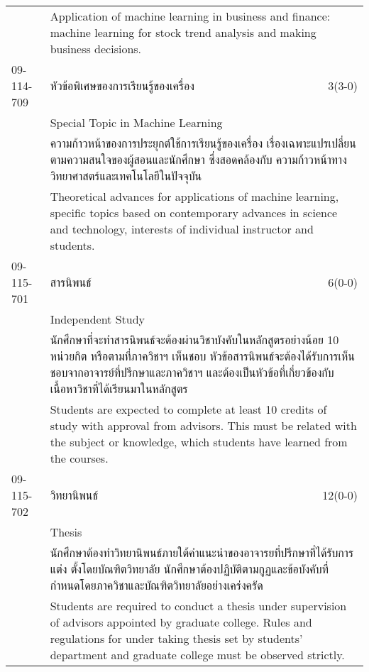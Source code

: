 \begin{longtable}{p{}p{}r{}}
&  \multicolumn{2}{p{0.75\textwidth}}{Application of machine learning in business and finance: machine learning for stock trend analysis and making business decisions.} \vspace{8mm} \\*
09-114-709 & หัวข้อพิเศษของการเรียนรู้ของเครื่อง  & 3(3-0)\\*
 & Special Topic in Machine Learning & \phantom{x} \vspace{3mm} \\*
&  \multicolumn{2}{p{0.75\textwidth}}{ความก้าวหน้าของการประยุกต์ใช้การเรียนรู้ของเครื่อง เรื่องเฉพาะแปรเปลี่ยนตามความสนใจของผู้สอนและนักศึกษา ซึ่งสอดคล้องกับ ความก้าวหน้าทางวิทยาศาสตร์และเทคโนโลยีในปัจจุบัน } \vspace{3mm} \\*
&  \multicolumn{2}{p{0.75\textwidth}}{Theoretical advances for applications of machine learning, specific topics based on contemporary advances in science and technology, interests of individual instructor and students.} \vspace{8mm} \\*
09-115-701 & สารนิพนธ์ & 6(0-0)\\*
 & Independent Study & \phantom{x} \vspace{3mm} \\*
&  \multicolumn{2}{p{0.75\textwidth}}{นักศึกษาที่จะทำสารนิพนธ์จะต้องผ่านวิชาบังคับในหลักสูตรอย่างน้อย 10 หน่วยกิต หรือตามที่ภาควิชาฯ เห็นชอบ หัวข้อสารนิพนธ์จะต้องได้รับการเห็นชอบจากอาจารย์ที่ปรึกษาและภาควิชาฯ และต้องเป็นหัวข้อที่เกี่ยวข้องกับเนื้อหาวิชาที่ได้เรียนมาในหลักสูตร } \vspace{3mm} \\*
&  \multicolumn{2}{p{0.75\textwidth}}{Students are expected to complete at least 10 credits of study with approval from advisors. This must be related with the subject or knowledge, which students have learned from the courses.} \vspace{8mm} \\*
09-115-702 & วิทยานิพนธ์ & 12(0-0)\\*
 & Thesis & \phantom{x} \vspace{3mm} \\*
&  \multicolumn{2}{p{0.75\textwidth}}{นักศึกษาต้องทำวิทยานิพนธ์ภายใต้คำแนะนำของอาจารยที่ปรึกษาที่ได้รับการแต่ง ตั้งโดยบัณฑิตวิทยาลัย นักศึกษาต้องปฏิบัติตามกูฏและข้อบังคับที่กำหนดโดยภาควิชาและบัณฑิตวิทยาลัยอย่างเคร่งครัด} \vspace{3mm} \\*
&  \multicolumn{2}{p{0.75\textwidth}}{Students are required to conduct a thesis under supervision of advisors appointed by graduate college. Rules and regulations for under taking thesis set by students’ department and graduate college must be observed strictly.} \vspace{8mm} \\*

\end{longtable}
